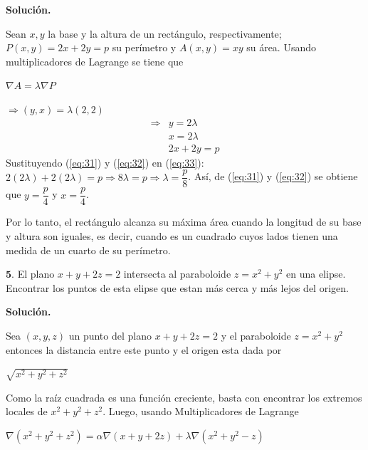 \documentclass[fleqn, 12pt]{article}
\begin{document}
\begin{list}{\bfseries Ejercicio}{ \addtolength{\itemindent}{-1mm}%
    \addtolength{\labelsep}{-1mm}%
    \addtolength{\leftmargin}{-1cm}%
    \addtolength{\labelwidth}{-1cm} }
    \textbf{Solución.}

    Sean $ x, y $ la base y la altura de un rectángulo, respectivamente; $ P(x,y) = 2x + 2y = p $ su perímetro y $ A(x,y) = xy $ su área. Usando multiplicadores de Lagrange se tiene que

    $ \nabla A = \lambda \nabla P $

    $ \Longrightarrow (y,x) = \lambda (2,2) $
    \begin{align}
        \Longrightarrow & y = 2 \lambda \label{eq:31} \\
        & x = 2 \lambda \label{eq:32} \\
        & 2x + 2y = p \label{eq:33}
    \end{align}
    Sustituyendo (\ref{eq:31}) y (\ref{eq:32}) en (\ref{eq:33}): $ 2(2 \lambda) + 2(2 \lambda) = p \Longrightarrow 8 \lambda = p \Longrightarrow \lambda = \dfrac{p}{8} $. Así, de (\ref{eq:31}) y (\ref{eq:32}) se obtiene que $ y = \dfrac{p}{4} $ y $ x = \dfrac{p}{4} $.

    Por lo tanto, el rectángulo alcanza su máxima área cuando la longitud de su base y altura son iguales, es decir, cuando es un cuadrado cuyos lados tienen una medida de un cuarto de su perímetro.

    \item $ \mathbf{5.} $ El plano $ x + y + 2z = 2 $ intersecta al paraboloide $ z = x^2 + y^2 $ en una elipse. Encontrar los puntos de esta elipse que estan más cerca y más lejos del origen.
    
    \textbf{Solución.}

    Sea $ (x,y,z) $ un punto del plano $ x + y + 2z = 2 $ y el paraboloide $ z = x^2 + y^2 $ entonces la distancia entre este punto y el origen esta dada por 

    $ \sqrt{x^2 + y^2 + z^2} $

    Como la raíz cuadrada es una función creciente, basta con encontrar los extremos locales de $ x^2 + y^2 + z^2 $. Luego, usando Multiplicadores de Lagrange

    $ \nabla (x^2 + y^2 + z^2) = \alpha \nabla (x + y + 2z) + \lambda \nabla (x^2 + y^2 - z) $


\end{list}
\end{document}
